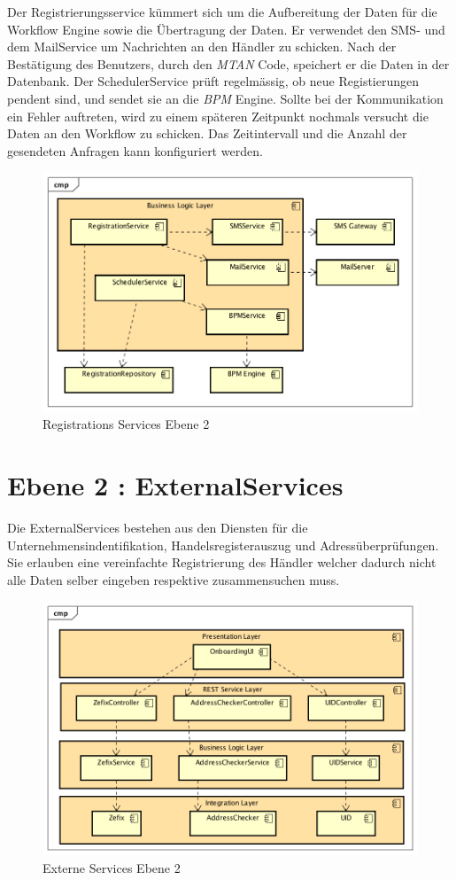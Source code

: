 Der Registrierungsservice kümmert sich um die Aufbereitung der Daten für die Workflow Engine sowie die Übertragung der Daten. Er verwendet den SMS- und dem MailService um Nachrichten an den Händler zu schicken. Nach der Bestätigung des Benutzers, durch den \textit{\gls{MTAN}} Code, speichert er die Daten in der Datenbank. Der SchedulerService prüft regelmässig, ob neue Registierungen pendent sind, und sendet sie an die \textit{\gls{BPM}} Engine. Sollte bei der Kommunikation ein Fehler auftreten, wird zu einem späteren Zeitpunkt nochmals versucht die Daten an den Workflow zu schicken. Das Zeitintervall und die Anzahl der gesendeten Anfragen kann konfiguriert werden.
\begin{figure}[H]
	\centering
	\includegraphics[scale=0.65]{RegistrationServicesLevel2.png}
	\caption{Registrations Services Ebene 2}
\end{figure}
\newpage
\section{Ebene 2 : ExternalServices}

Die ExternalServices bestehen aus den Diensten für die Unternehmensindentifikation, Handelsregisterauszug und Adressüberprüfungen. Sie erlauben eine vereinfachte Registrierung des Händler welcher dadurch nicht alle Daten selber eingeben respektive zusammensuchen muss.

\begin{figure}[H]
	\centering
	\includegraphics[scale=0.65]{ExternalServicesLevel2.png}
	\caption{Externe Services Ebene 2}
\end{figure}